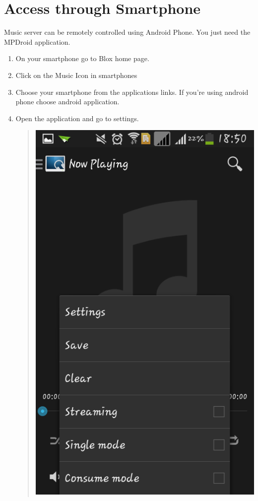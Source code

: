 \documentclass[letterpaper,10pt,english]{sphinxmanual}
\begin{document}
\section{Access through Smartphone}
\label{music:id4}\label{music:access-through-smartphone}
Music server can be remotely controlled using Android Phone. You just need the MPDroid application.
\begin{enumerate}
\item {} 
On your smartphone go to Blox home page.

\item {} 
Click on the Music Icon in smartphones

\item {} 
Choose your smartphone from the applications links. If you're using android phone choose android application.

\item {} 
Open the application and go to settings.
\begin{quote}

\includegraphics{mpd2.png}
\end{quote}


\end{enumerate}
\end{document}
